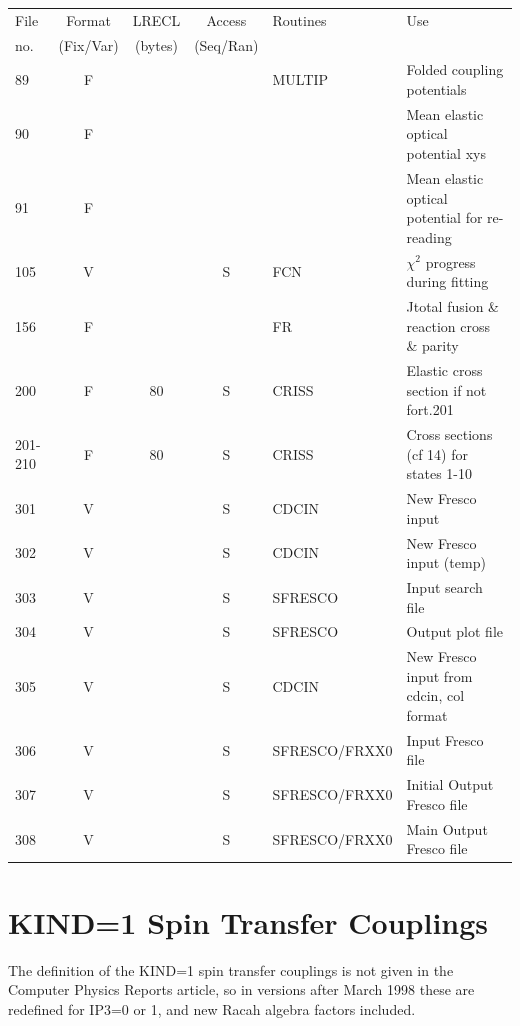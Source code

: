 \documentclass[11pt]{article}
\begin{document}
{\begin{tabular}{|l | c c c | l | l|}
\hline
\end{tabular}

\begin{tabular}{|l | c c c | l | l|}
\hline
File & Format & LRECL  & Access & Routines & Use \\
 no. & (Fix/Var) & (bytes) & (Seq/Ran) &  &  \\
\hline

89    &   F &            &    &     MULTIP& Folded coupling potentials\\
90   & F &              &   &  & Mean elastic optical potential xys\\
91   & F &              &   & &  Mean elastic optical potential for re-reading\\

105     & V &         & S  &     FCN   &  $\chi^2$ progress during fitting\\
156    &   F &            &    &     FR & Jtotal fusion \& reaction cross \& parity\\
200 & F & 80     & S  &     CRISS   & Elastic cross section if not fort.201 \\
201-210 & F & 80     & S  &     CRISS   & Cross sections (cf 14) for states 1-10\\
301 & V &      & S  &     CDCIN   & New Fresco input \\
302 & V &      & S  &     CDCIN   & New Fresco input  (temp) \\
303 & V &      & S  &     SFRESCO   & Input search file \\
304 & V &      & S  &     SFRESCO   & Output plot file \\
305 & V &      & S  &     CDCIN   & New Fresco input from cdcin, col format \\
306 & V &      & S  &     SFRESCO/FRXX0   & Input Fresco file \\
307 & V &      & S  &     SFRESCO/FRXX0   & Initial Output Fresco file \\
308 & V &      & S  &     SFRESCO/FRXX0   & Main Output Fresco file \\
\hline
\end{tabular}


}


\newpage
\section{KIND=1 Spin Transfer Couplings}
\label{spintransfers}
The definition of the KIND=1 spin transfer couplings is not given
in the Computer Physics Reports article, so in versions after March 1998 these
are redefined for IP3=0 or 1, and new Racah algebra factors included.
\end{document}
